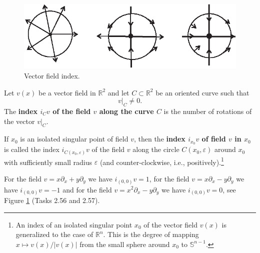 \begin{figure}[!ht]
	\centering
	\includegraphics [scale=1.6]{jtr210}
	\caption{Vector field index.}
	\label{fig:2.10}
\end{figure}

\begin{definition}
	Let $ v (x) $ be a vector field in $ \mathbb {R} ^ {2} $ and let $ C \subset \mathbb {R} ^ {2} $ be an oriented curve such that
	\begin{equation}
		\label{2.12}
		v|_{C}\not=0.
	\end{equation}
	The \textbf{index  $i_{C}v$ of the field $v$ along the curve $ C $} is the number of rotations of the vector $ v |_{C} $.
	
	If $ x_ {0} $ is an isolated singular point of field $ v $, then the \textbf{index $ i_ {x_ {0}} v $ of field $ v $ in $ x_ {0} $} is called the index $ i_ {C (x_ {0}, \varepsilon)} v $ of the field $ v $ along the circle $ C (x_ {0}, \varepsilon) $ around $ x_{0} $ with sufficiently small radius $ \varepsilon $ (and counter-clockwise, i.e., positively).\footnote{An index of an isolated singular point $ x_ {0} $ of the vector field $ v (x) $ is generalized to the case of $ \mathbb {R} ^ {n} $. This is the degree of mapping $ x \longmapsto v (x)/ \left \vert v (x) \right \vert $ from the small sphere around $ x_ {0} $ to $ \mathbb {S} ^ {n-1}$.}
\end{definition}

\begin{example}
	For the field $v=x\partial _{x}+y\partial _{y}$ we have $i_{(0,0)}v=1$, for the field $v=x\partial _{x}-y\partial _{y}$ we have $i_{(0,0)}v=-1$ and for the field $v=x^{2}\partial _{x} - y\partial _{y}$ we have $i_{(0,0)}v=0$, see Figure \ref{fig:2.10} (Tasks 2.56 and 2.57).
\end{example}

